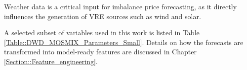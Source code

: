 \documentclass[class=scrbook, crop=false]{standalone}
\begin{document}
Weather data is a critical input for imbalance price forecasting, as it directly influences the generation of \gls{VRE} sources such as wind and solar.

A selected subset of variables used in this work is listed in Table \ref{Table::DWD_MOSMIX_Parameters_Small}. Details on how the forecasts are transformed into model-ready features are discussed in Chapter \ref{Section::Feature_engineering}.




\end{document}
